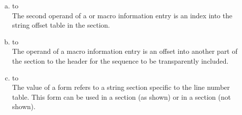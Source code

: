 \begin{enumerate}[(a)]
\item \dotdebugmacro{} to \dotdebugstroffsets \\
The second operand of a 
\DWMACROdefineindirectx{} or \DWMACROundefindirectx{} 
macro information entry is an index
into the string offset table in the 
\dotdebugstroffsets{} section.

\item \dotdebugmacro{} to \dotdebugmacro \\
The operand of a 
\DWMACROtransparentinclude{} macro information
entry is an offset into another part of the 
\dotdebugmacro{} section to the header for the 
sequence to be transparently included.

\item \dotdebugline{} to \dotdebuglinestr \\
The value of a \DWFORMlinestrp{} form refers to a
string section specific to the line number table.
This form can be used in a \dotdebugline{} section
(as shown) or in a \dotdebuginfo{} section (not shown).

\end{enumerate}
